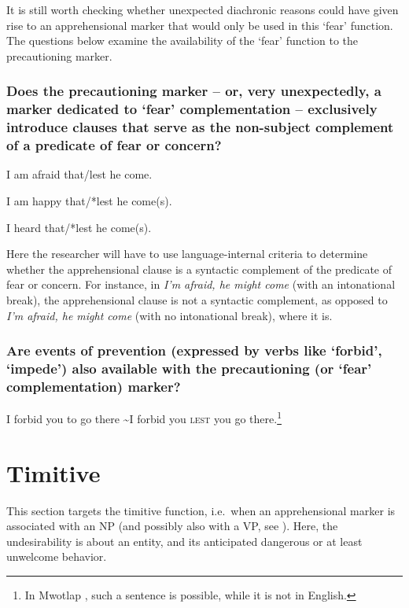 \documentclass[output=paper,colorlinks,citecolor=brown]{langscibook}
\begin{document}
It is still worth checking whether unexpected diachronic reasons could have given rise to an apprehensional marker that would only be used in this `fear' function. The questions below examine the availability of the `fear' function to the precautioning marker.


\subsubsection{Does the precautioning marker -- or, very unexpectedly, a marker dedicated to `fear' complementation -- exclusively introduce clauses that serve as the non-subject complement of a predicate of fear or concern?}
\label{2.6.1}

\ea \label{p58} I am afraid that\textnormal{/}lest he come.
\z

\ea \label{p59} I am happy that\textnormal{/*}lest he come(s).
\z

\ea \label{p60} I heard that\textnormal{/*}lest he come(s).
\z

\noindent Here the researcher will have to use language-internal criteria to determine whether the apprehensional clause is a syntactic complement of the predicate of fear or concern. For instance, in \textit{I'm afraid, he might come} (with an intonational break), the apprehensional clause is not a syntactic complement, as opposed to \textit{I'm afraid, he might come} (with no intonational break), where it is.

\subsubsection{Are events of prevention (expressed by verbs like `forbid', `impede') also available with the precautioning (or `fear' complementation) marker?}
\label{2.6.2}

\ea \label{p63odd} I forbid you to go there {\op}\sim I forbid you \textsc{lest} you go there{\cp}.\textnormal{\footnote{In Mwotlap \citep[304--305]{francois2003}, such a sentence is possible, while it is not in English.}}
\z




\section{Timitive}
\label{sec:timitive}

This section targets the timitive function, i.e.\ when an apprehensional marker is associated with an NP (and possibly also with a VP, see ). Here, the undesirability is about an entity, and its anticipated dangerous or at least unwelcome behavior. 
\end{document}
